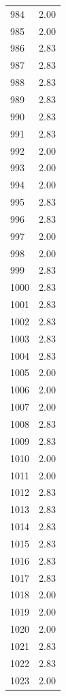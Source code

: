 \documentclass[a4paper,11pt]{article}
\begin{document}
\begin{center}
\begin{longtable}{|R{1.5cm}|R{2.5cm}|}
  984  &         2.00 \\ 
  985  &         2.00 \\ 
  986  &         2.83 \\ 
  987  &         2.83 \\ 
  988  &         2.83 \\ 
  989  &         2.83 \\ 
  990  &         2.83 \\ 
  991  &         2.83 \\ 
  992  &         2.00 \\ 
  993  &         2.00 \\ 
  994  &         2.00 \\ 
  995  &         2.83 \\ 
  996  &         2.83 \\ 
  997  &         2.00 \\ 
  998  &         2.00 \\ 
  999  &         2.83 \\ 
 1000  &         2.83 \\ 
 1001  &         2.83 \\ 
 1002  &         2.83 \\ 
 1003  &         2.83 \\ 
 1004  &         2.83 \\ 
 1005  &         2.00 \\ 
 1006  &         2.00 \\ 
 1007  &         2.00 \\ 
 1008  &         2.83 \\ 
 1009  &         2.83 \\ 
 1010  &         2.00 \\ 
 1011  &         2.00 \\ 
 1012  &         2.83 \\ 
 1013  &         2.83 \\ 
 1014  &         2.83 \\ 
 1015  &         2.83 \\ 
 1016  &         2.83 \\ 
 1017  &         2.83 \\ 
 1018  &         2.00 \\ 
 1019  &         2.00 \\ 
 1020  &         2.00 \\ 
 1021  &         2.83 \\ 
 1022  &         2.83 \\ 
 1023  &         2.00 \\ 

\end{longtable}
\end{center}
\end{document}
